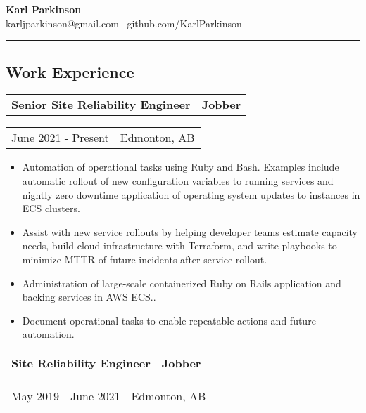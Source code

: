 \documentclass[10pt,letterpaper]{article}
\makeatletter
\newcommand{\headerrow}[2]
{\begin{tabular*}{\linewidth}{l@{\extracolsep{\fill}}r}
	#1 &
	#2 \\
\end{tabular*}}
\makeatother
\begin{document}
\begin{center}
{\LARGE \textbf{Karl Parkinson}}
\\
karljparkinson@gmail.com \textbullet \ github.com/KarlParkinson

\end{center}

\hrule

\subsection*{Work Experience}
       \headerrow
       	        {\textbf{Senior Site Reliability Engineer}}
	        {\textbf{Jobber}}
	\headerrow
		{June 2021 - Present}
		{Edmonton, AB}
		
       \begin{itemize}
          \itemsep0em
                \item Automation of operational tasks using Ruby and Bash. Examples include automatic rollout of new configuration variables to running services and nightly zero downtime application of operating system updates to instances in ECS clusters.
                \item Assist with new service rollouts by helping developer teams estimate capacity needs, build cloud infrastructure with Terraform, and write playbooks to minimize MTTR of future incidents after service rollout.
                \item Administration of large-scale containerized Ruby on Rails application and backing services in AWS ECS..
                \item Document operational tasks to enable repeatable actions and future automation.
        \end{itemize}
       \headerrow
       	        {\textbf{Site Reliability Engineer}}
	        {\textbf{Jobber}}
	\headerrow
		{May 2019 - June 2021}
		{Edmonton, AB}
		
\end{document}
